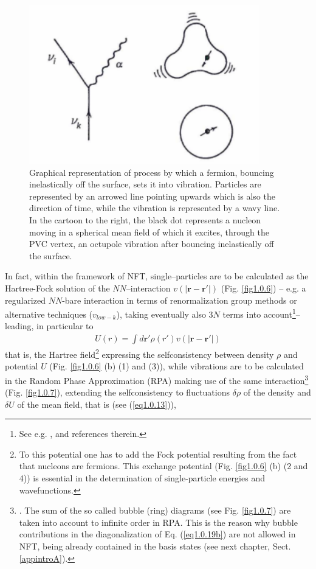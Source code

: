   \begin{figure}
  	\centerline {
  		\includegraphics*[width=10cm]{introduccion/figs/figpreface5}
  	}
  	\caption{Graphical representation of  process       by which a fermion, bouncing inelastically off the surface, sets it into vibration. Particles are represented by an arrowed line pointing upwards which is also the direction of time, while the vibration is represented by a wavy line. In the cartoon to the right, the black dot represents a nucleon moving in a spherical mean field of which it excites, through the PVC vertex, an octupole vibration after bouncing inelastically off the surface.}
  	\label{fig1.0.5}
  \end{figure}
In fact, within the framework of NFT, single--particles are to be calculated as the Hartree-Fock solution of the $NN$--interaction $v(|\mathbf r-\mathbf r'|)$ (Fig. \ref{fig1.0.6}) -- e.g. a regularized $NN$-bare interaction in terms of renormalization group methods or alternative techniques ($v_{low-k}$), taking eventually also 3$N$ terms into account\footnote{\label{f9}See e.g. \cite{Duguet:13,Duguet:04,Duguet:08,Lesinski:09,Hebeler:09,Baroni:10,Duguet:10,Lesinski:11,Hergert:09}, and references therein.}-- leading, in particular to
\begin{align}\label{eq1.0.18}
U(r)=\int d\mathbf r' \rho(r')v\left(|\mathbf r-\mathbf r'|\right)
\end{align}
that is, the Hartree field\footnote{To this potential one has to add the Fock potential resulting from the fact that nucleons are fermions. This exchange potential (Fig. \ref{fig1.0.6} (b) (2 and 4)) is essential in the determination of single-particle energies and wavefunctions.} expressing the selfconsistency between density $\rho$ and potential $U$ (Fig. \ref{fig1.0.6} (b) (1) and (3)), while vibrations are to be calculated in the Random Phase Approximation (RPA) making use of the same interaction\footnote{\cite{Bohm:51,Bohm:53}. The sum of the so called bubble (ring) diagrams (see Fig. \ref{fig1.0.7}) are taken into account to infinite order in RPA. This is the reason why bubble contributions in the diagonalization of Eq. (\ref{eq1.0.19b}) are not allowed in NFT, being already contained in the basis states (see next chapter, Sect. \ref{appintroA}).} (Fig. \ref{fig1.0.7}), extending the selfconsistency to fluctuations $\delta\rho$ of the density and $\delta U$ of the mean field, that is (see (\ref{eq1.0.13})),
